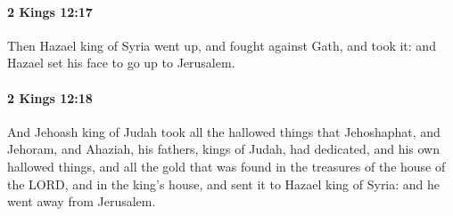 		\paragraph{2 Kings 12:17} %
			\label{2KINGS-12-17}

			Then Hazael king of Syria went up, and fought against Gath, and took it: and Hazael set his face to go up to Jerusalem.


		\paragraph{2 Kings 12:18} %
			\label{2KINGS-12-18}

			And Jehoash king of Judah took all the hallowed things that Jehoshaphat, and Jehoram, and Ahaziah, his fathers, kings of Judah, had dedicated, and his own hallowed things, and all the gold that was found in the treasures of the house of the LORD, and in the king’s house, and sent it to Hazael king of Syria: and he went away from Jerusalem.

